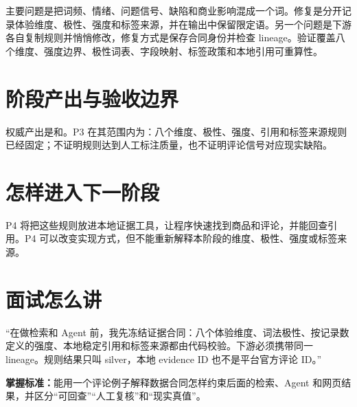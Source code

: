 主要问题是把词频、情绪、问题信号、缺陷和商业影响混成一个词。修复是分开记录体验维度、极性、强度和标签来源，并在输出中保留限定语。另一个问题是下游各自复制规则并悄悄修改，修复方式是保存合同身份并检查 lineage。验证覆盖八个维度、强度边界、极性词表、字段映射、标签政策和本地引用可重算性。

\section{阶段产出与验收边界}

权威产出是和。P3 在其范围内为\statuspassed：八个维度、极性、强度、引用和标签来源规则已经固定；不证明规则达到人工标注质量，也不证明评论信号对应现实缺陷。

\section{怎样进入下一阶段}

P4 将把这些规则放进本地证据工具，让程序快速找到商品和评论，并能回查引用。P4 可以改变实现方式，但不能重新解释本阶段的维度、极性、强度或标签来源。

\section{面试怎么讲}

\begin{interviewbox}
“在做检索和 Agent 前，我先冻结证据合同：八个体验维度、词法极性、按记录数定义的强度、本地稳定引用和标签来源都由代码校验。下游必须携带同一 lineage。规则结果只叫 silver，本地 evidence ID 也不是平台官方评论 ID。”
\end{interviewbox}

\textbf{掌握标准：}能用一个评论例子解释数据合同怎样约束后面的检索、Agent 和网页结果，并区分“可回查”“人工复核”和“现实真值”。
